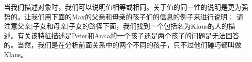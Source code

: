 当我们描述对象时，我们可以说明值相等或相同。关于值的同一性的说明是更为强势的。让我们用下面的Max的父亲和母亲的孩子们的信息的例子来进行说明：
\ea
{}
\z
请注意\textsc{父亲$|$子女}和\textsc{母亲$|$子女}的路径下面，我们找到一个包括名为Klaus的人的描述。有关该特征描述是Peter和Anna的一个孩子还是两个孩子的问题是无法回答的。当然，我们是在分析前面关系中的两个不同的孩子，只不过他们碰巧都叫做Klaus。

